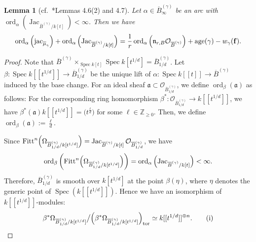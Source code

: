 \documentclass[a4paper,11pt]{amsart}
\newtheorem{lem}[thm]{Lemma}
\theoremstyle{definition}
\theoremstyle{remark}
\begin{document}
\begin{lem}[cf.\ \cite{NS22}*{Lemmas 4.6(2) and 4.7}]\label{lem:L3}
Let $\alpha \in \overline{B}^{(\gamma)} _{\infty}$ be an arc with 
$\operatorname{ord}_{\alpha} \left( \operatorname{Jac} _{\overline{B}^{(\gamma)}/k[t]} \right) < \infty$. 
Then we have
\[\operatorname{ord}_{\alpha} \left( \operatorname{jac}_{\overline{\mu} _{\gamma}} \right) 
+ \operatorname{ord}_{\alpha} \left( \operatorname{Jac} _{\overline{B}^{(\gamma)}/k[t]} \right)
= \frac{1}{r} \operatorname{ord}_{\alpha} \left( \mathfrak{n}_{r,B} \mathcal{O}_{\overline{B}^{(\gamma)}} \right) 
+ \operatorname{age}(\gamma)-w_\gamma({\bf f}). 
\]
\end{lem}
\begin{proof}
Note that $\overline{B}^{(\gamma)} \times _{\operatorname{Spec} k[t]} \operatorname{Spec} k[t^{1/d}] = \overline{B}^{(\gamma)}_{1/d}$. 
Let $\beta:\operatorname{Spec} k[[t^{1/d}]]\rightarrow \overline{B}_{1/d}^{(\gamma)}$ be the unique lift of $\alpha: \operatorname{Spec} k[[t]]\rightarrow\overline{B}^{(\gamma)}$ induced by the base change. 
For an ideal sheaf $\mathfrak{a} \subset \mathcal{O}_{\overline{B}^{(\gamma)}_{1/d}}$, we define $\operatorname{ord} _{\beta} (\mathfrak{a})$ as follows: 
For the corresponding ring homomorphism $\beta ^*: \mathcal{O}_{\overline{B}^{(\gamma)}_{1/d}} \to k[[t^{1/d}]]$, 
we have $\beta ^* (\mathfrak{a})k[[t^{1/d}]] = \bigl( t^{\frac{\ell}{d}} \bigr)$ for some $\ell \in \mathbb{Z}_{\ge 0}$. 
Then, we define $\operatorname{ord} _{\beta} (\mathfrak{a}) := \frac{\ell}{d}$. 

Since $\operatorname{Fitt}^n \Bigl( \Omega _{\overline{B}^{(\gamma)}_{1/d}/k[t^{1/d}]} \Bigr) = \operatorname{Jac} _{\overline{B}^{(\gamma)}/k[t]} \mathcal{O}_{\overline{B}^{(\gamma)}_{1/d}}$, we have 
\[
\operatorname{ord}_{\beta} \left( \operatorname{Fitt}^n \Bigl( \Omega _{\overline{B}^{(\gamma)}_{1/d}/k[t^{1/d}]} \Bigr) \right)
= \operatorname{ord}_{\alpha} \left( \operatorname{Jac} _{\overline{B}^{(\gamma)}/k[t]} \right) < \infty. 
\]
Therefore, 
$\overline{B}^{(\gamma)}_{1/d}$ is smooth over $k[t^{1/d}]$ at the point $\beta (\eta)$, where $\eta$ denotes the generic point of  $\operatorname{Spec}(k[[t^{1/d}]])$. 
Hence we have an isomorphism of $k[[t^{1/d}]]$-modules:
\[
\beta ^* \Omega _{\overline{B}^{(\gamma)}_{1/d}/k[t^{1/d}]} \big/ \Bigl( \beta ^* \Omega _{\overline{B}^{(\gamma)}_{1/d}/k[t^{1/d}]} \Bigr)_{\rm tor} \simeq k[[t^{1/d}]]^{\oplus n}. \tag{i}
\]



\end{proof}
\end{document}
